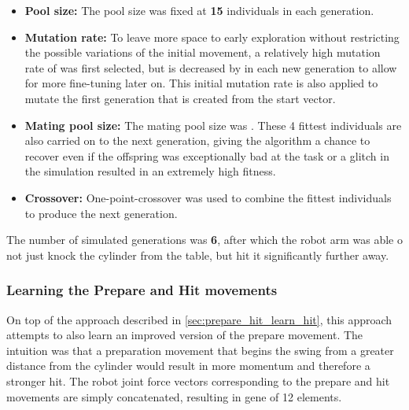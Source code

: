 \begin{itemize}
\item \textbf{Pool size:} The pool size was fixed at \textbf{15} individuals in each generation. 
\item \textbf{Mutation rate:} To leave more space to early exploration without restricting the possible variations of the initial movement, a relatively high mutation rate of  was first selected, but is decreased by  in each new generation to allow for more fine-tuning later on. This initial mutation rate is also applied to mutate the first generation that is created from the start vector.
\item \textbf{Mating pool size:} The mating pool size was . These 4 fittest individuals are also carried on to the next generation, giving the algorithm a chance to recover even if the offspring was exceptionally bad at the task or a glitch in the simulation resulted in an extremely high fitness.
\item \textbf{Crossover:} One-point-crossover was used to combine the fittest individuals to produce the next generation.
\end{itemize}

The number of simulated generations was \textbf{6}, after which the robot arm was able o not just knock the cylinder from the table, but hit it significantly further away.


\subsubsection{Learning the Prepare and Hit movements} 

On top of the approach described in \ref{sec:prepare_hit_learn_hit}, this approach attempts to also learn an improved version of the prepare movement. The intuition was that a preparation movement that begins the swing from a greater distance from the cylinder would result in more momentum and therefore a stronger hit.
The robot joint force vectors corresponding to the prepare and hit movements are simply concatenated, resulting in gene of 12 elements.

